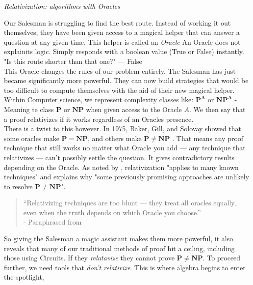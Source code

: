 \documentclass[12pt]{report}
\begin{document}
\begin{center}
    \vspace{0cm}
    {\Large\itshape Relativization: algorithms with Oracles\par}
\end{center}
Our Salesman is struggling to find the best route.
Instead of working it out themselves, they have been given access to a magical helper that can answer a question at any given time.
This helper is called an \textit{Oracle}
An Oracle does not explainits logic.
Simply responds with a boolean value (True or False) instantly.\\
"Is this route shorter than that one?" --- False\\
This Oracle changes the rules of our problem entirely.
The Salesman has just became significantly more powerful.
They can now build strategies that would be too difficult to compute themselves with the aid of their new magical helper.
Within Computer science, we represent complexity classes like: $\mathbf{P^A}$ or $\mathbf{NP^A}$ - Meaning te class $\mathbf{P}$ or $\mathbf{NP}$ when given access to the Oracle $A$.
We then say that a proof relativizes if it works regardless of an Oracles presence.\\
There is a twist to this however.
In 1975, Baker, Gill, and Solovay showed that some oracles make $\mathbf{P = NP}$, and others make $\mathbf{P \ne NP}$ \citep{baker1975relativizations}.
That means any proof technique that still works no matter what Oracle you add — any technique that relativizes — can’t possibly settle the question. It gives contradictory results depending on the Oracle.
As noted by \cite{arora2009}, relativization "applies to many known techniques" and explains why "some previously promising approaches are unlikely to resolve $\mathbf{P \ne NP}$".
\begin{quote}
    “Relativizing techniques are too blunt — they treat all oracles equally, even when the truth depends on which Oracle you choose.”\\
    - Paraphrased from \cite{baker1975relativizations}
\end{quote}
So giving the Salesman a magic assistant makes them more powerful, it also reveals that many of our traditional methods of proof hit a ceiling, including those using Circuits.
If they \textit{relatavize} they cannot prove  $\mathbf{P \ne NP}$.
To proceed further, we need tools that \textit{don't relativize}.
This is where algebra begins to enter the spotlight,
\end{document}
